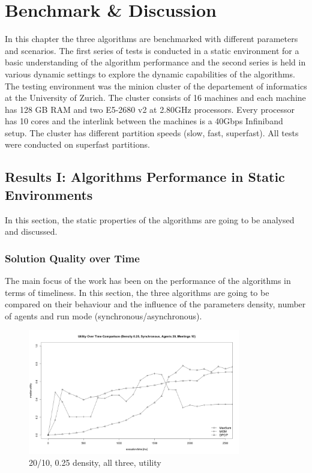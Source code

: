 \chapter{Benchmark \& Discussion}

In this chapter the three algorithms are benchmarked with different parameters and scenarios. The first series of tests is conducted in a static environment for a basic understanding of the algorithm performance and the second series is held in various dynamic settings to explore the dynamic capabilities of the algorithms. The testing environment was the minion cluster of the departement of informatics at the University of Zurich. The cluster consists of 16 machines and each machine has 128 GB RAM and two E5-2680 v2 at 2.80GHz processors. Every processor has 10 cores and the interlink between the machines is a 40Gbps Infiniband setup. The cluster has different partition speeds (slow, fast, superfast). All tests were conducted on superfast partitions.

\section{Results I: Algorithms Performance in Static Environments}

In this section, the static properties of the algorithms are going to be analysed and discussed.

\subsection{Solution Quality over Time}

The main focus of the work has been on the performance of the algorithms in terms of timeliness.  In this section, the three algorithms are going to be compared on their behaviour and the influence of the parameters density, number of agents and run mode (synchronous/asynchronous).

\begin{figure}[H]
\centering
\includegraphics[width=350px]{graphics/experiments/static/st_1}
\caption{20/10, 0.25 density, all three, utility}
\label{fig:st1}
\end{figure}


